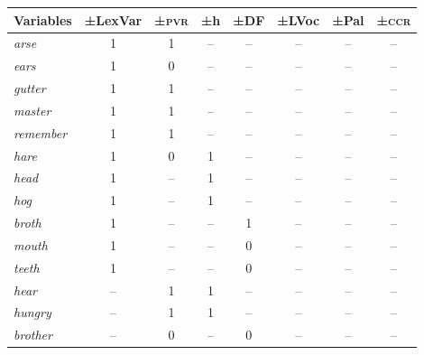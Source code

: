 {{{{{{{{{\begin{table}
\begin{tabularx}{.9\textwidth}{Xccccccc}
\lsptoprule 
Variables & ±LexVar & ±\textsc{pvr} & ±h & ±DF & ±LVoc & ±Pal & ±\textsc{ccr}  \\
\midrule 
\emph{arse} \cellcolor{green!35} & 1\cellcolor{green!35} & 1\cellcolor{green!35} & -- & -- & --  & -- & --  \\  
\emph{ears} \cellcolor{green!35} & 1\cellcolor{green!35} & 0\cellcolor{green!35} & -- & -- & --  & -- & --   \\  
\emph{gutter} \cellcolor{green!35} & 1\cellcolor{green!35} & 1\cellcolor{green!35} & -- & -- & --  & -- & --   \\  
\emph{master} \cellcolor{green!35} & 1\cellcolor{green!35} & 1\cellcolor{green!35} & -- & -- & --  & -- & --   \\  
\emph{remember} \cellcolor{green!35} & 1\cellcolor{green!35} & 1\cellcolor{green!35} & -- & -- & --  & -- & -- \\  
\emph{hare} \cellcolor{green!35} & 1\cellcolor{green!35} & 0 \cellcolor{green!35}& 1\cellcolor{green!35} & -- & --  & -- & --  \\  
\emph{head}\cellcolor{green!35} & 1\cellcolor{green!35} & --\cellcolor{green!35} & 1\cellcolor{green!35} & -- & --  & -- & --  \\  
\emph{hog} \cellcolor{green!35} & 1\cellcolor{green!35} & -- \cellcolor{green!35}& 1\cellcolor{green!35} & -- & --  & -- & --  \\ 
\emph{broth} \cellcolor{green!35} & 1\cellcolor{green!35} & --\cellcolor{green!35} & --\cellcolor{green!35} & 1\cellcolor{green!35} & --  & -- & -- \\
\emph{mouth} \cellcolor{green!35} & 1\cellcolor{green!35} & --\cellcolor{green!35} & --\cellcolor{green!35} & 0\cellcolor{green!35} & --  & -- & --  \\  
\emph{teeth} \cellcolor{green!35} & 1\cellcolor{green!35} & --\cellcolor{green!35} & --\cellcolor{green!35} & 0\cellcolor{green!35} & --  & -- & --  \\  
\emph{hear} \cellcolor{blue!35} & \cellcolor{blue!35} -- & \cellcolor{blue!35} 1 & \cellcolor{blue!35} 1 & -- & --  & -- & --  \\  
\emph{hungry} \cellcolor{blue!35} & \cellcolor{blue!35} -- & \cellcolor{blue!35} 1 & \cellcolor{blue!35} 1 & -- & --  & -- & --  \\ 
\emph{brother}\cellcolor{blue!35}  &\cellcolor{blue!35}  -- &\cellcolor{blue!35}  0 &\cellcolor{blue!35}  -- & \cellcolor{blue!35} 0 & --  & -- & --  \\ 

\end{tabularx}
\end{table}}}}}}}}}}
